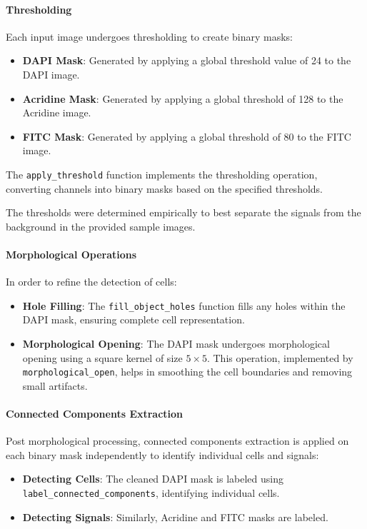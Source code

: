 \documentclass[a4paper,12pt]{article}
\begin{document}
\paragraph{Thresholding}

Each input image undergoes thresholding to create binary masks:
\begin{itemize}
    \item \textbf{DAPI Mask}: Generated by applying a global threshold value of 24 to the DAPI image.
    \item \textbf{Acridine Mask}: Generated by applying a global threshold of 128 to the Acridine image.
    \item \textbf{FITC Mask}: Generated by applying a global threshold of 80 to the FITC image.
\end{itemize}
The \texttt{apply\_threshold} function implements the thresholding operation, converting channels into binary masks based on the specified thresholds.

The thresholds were determined empirically to best separate the signals from the background in the provided sample images.

\paragraph{Morphological Operations}

In order to refine the detection of cells:
\begin{itemize}
    \item \textbf{Hole Filling}: The \texttt{fill\_object\_holes} function fills any holes within the DAPI mask, ensuring complete cell representation.
    \item \textbf{Morphological Opening}: The DAPI mask undergoes morphological opening using a square kernel of size \(5 \times 5\). This operation, implemented by \texttt{morphological\_open}, helps in smoothing the cell boundaries and removing small artifacts.
\end{itemize}

\paragraph{Connected Components Extraction}

Post morphological processing, connected components extraction is applied on each binary mask independently to identify individual cells and signals:
\begin{itemize}
    \item \textbf{Detecting Cells}: The cleaned DAPI mask is labeled using \texttt{label\_connected\_components}, identifying individual cells.
    \item \textbf{Detecting Signals}: Similarly, Acridine and FITC masks are labeled.
\end{itemize}
\end{document}
